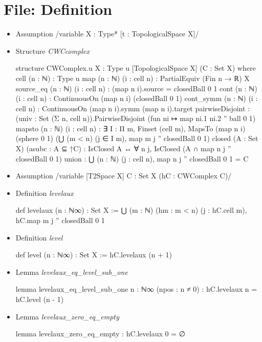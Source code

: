 \documentclass[colorinlistoftodos]{article}
\newcommand{\todonoturgentinline}[1]{\todo[inline, color=yellow]{#1}}
\begin{document}
\section{File: Definition}

\begin{itemize}
  \item Assumption \lean /variable {X : Type*} [t : TopologicalSpace X]/
  \item Structure \emph{CWCcomplex}
\begin{leancode}
structure CWComplex.{u} {X : Type u} [TopologicalSpace X] (C : Set X) where
  cell (n : ℕ) : Type u
  map (n : ℕ) (i : cell n) : PartialEquiv (Fin n → ℝ) X
  source_eq (n : ℕ) (i : cell n) : (map n i).source = closedBall 0 1
  cont (n : ℕ) (i : cell n) : ContinuousOn (map n i) (closedBall 0 1)
  cont_symm (n : ℕ) (i : cell n) : ContinuousOn (map n i).symm (map n i).target
  pairwiseDisjoint :
    (univ : Set (Σ n, cell n)).PairwiseDisjoint (fun ni ↦ map ni.1 ni.2 '' ball 0 1)
  mapsto (n : ℕ) (i : cell n) : ∃ I : Π m, Finset (cell m),
    MapsTo (map n i) (sphere 0 1) (⋃ (m < n) (j ∈ I m), map m j '' closedBall 0 1)
  closed (A : Set X) (asubc : A ⊆ ↑C) : 
    IsClosed A ↔ ∀ n j, IsClosed (A ∩ map n j '' closedBall 0 1)
  union : ⋃ (n : ℕ) (j : cell n), map n j '' closedBall 0 1 = C
\end{leancode}
  \item Assumption \lean /variable [T2Space X] {C : Set X} (hC : CWComplex C)/
  \item Definition \emph{levelaux}
\begin{leancode}
def levelaux (n : ℕ∞) : Set X :=
  ⋃ (m : ℕ) (hm : m < n) (j : hC.cell m), hC.map m j '' closedBall 0 1
\end{leancode}
  \item Definition \emph{level}
\begin{leancode}
def level (n : ℕ∞) : Set X :=
  hC.levelaux (n + 1)
\end{leancode}
  \item Lemma \emph{levelaux\_eq\_level\_sub\_one}
\begin{leancode}
lemma levelaux_eq_level_sub_one {n : ℕ∞} (npos : n ≠ 0) : hC.levelaux n = hC.level (n - 1)
\end{leancode}
  \item Lemma \emph{levelaux\_zero\_eq\_empty}
\begin{leancode}
lemma levelaux_zero_eq_empty : hC.levelaux 0 = ∅
\end{leancode}
\todonoturgentinline{Add CW-Complex of finite type}

\end{itemize}
\end{document}
